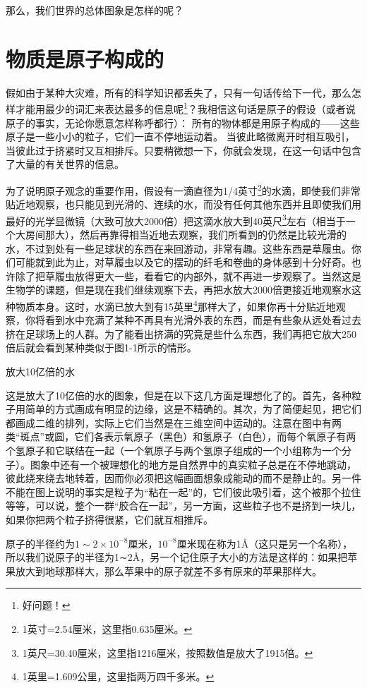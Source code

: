 \documentclass[12pt,oneside]{book}
\begin{document}
那么，我们世界的总体图象是怎样的呢？


\section{物质是原子构成的}
假如由于某种大灾难，所有的科学知识都丢失了，只有一句话传给下一代，那么怎样才能用最少的词汇来表达最多的信息呢\footnote{好问题！}？我相信这句话是原子的假设（或者说原子的事实，无论你愿意怎样称呼都行）： 所有的物体都是用原子构成的——这些原子是一些小小的粒子，它们一直不停地运动着。 当彼此略微离开时相互吸引， 当彼此过于挤紧时又互相排斥。只要稍微想一下，你就会发现，在这一句话中包含了大量的有关世界的信息。

为了说明原子观念的重要作用，假设有一滴直径为1/4英寸\footnote{1英寸=2.54厘米，这里指0.635厘米。}的水滴，即使我们非常贴近地观察，也只能见到光滑的、连续的水，而没有任何其他东西并且即使我们用最好的光学显微镜（大致可放大2000倍）把这滴水放大到40英尺\footnote{1英尺=30.40厘米，这里指1216厘米，按照数值是放大了1915倍。}左右（相当于一个大房间那大），然后再靠得相当近地去观察，我们所看到的仍然是比较光滑的水，不过到处有一些足球状的东西在来回游动，非常有趣。这些东西是草履虫。你们可能就到此为止，对草履虫以及它的摆动的纤毛和卷曲的身体感到十分好奇。也许除了把草履虫放得更大一些，看看它的内部外，就不再进一步观察了。当然这是生物学的课题，但是现在我们继续观察下去，再把水放大2000倍更接近地观察水这种物质本身。这时，水滴已放大到有15英里\footnote{1英里=1.609公里，这里指两万四千多米。}那样大了，如果你再十分贴近地观察，你将看到水中充满了某种不再具有光滑外表的东西，而是有些象从远处看过去挤在足球场上的人群。为了能看出挤满的究竟是些什么东西，我们再把它放大250倍后就会看到某种类似于图1-1所示的情形。
\begin{fig}{放大10亿倍的水}
\caption{放大10亿倍的水}
\label{fig:放大10亿倍的水}
\end{fig}
这是放大了10亿倍的水的图象，但是在以下这几方面是理想化了的。首先，各种粒子用简单的方式画成有明显的边缘，这是不精确的。其次，为了简便起见，把它们都画成二维的排列，实际上它们当然是在三维空间中运动的。注意在图中有两类“斑点”或圆，它们各表示氧原子（黑色）和氢原子（白色），而每个氧原子有两个氢原子和它联结在一起（一个氧原子与两个氢原子组成的一个小组称为一个分子）。图象中还有一个被理想化的地方是自然界中的真实粒子总是在不停地跳动，彼此绕来绕去地转着，因而你必须把这幅画面想象成能动的而不是静止的。另一件不能在图上说明的事实是粒子为“粘在一起”的，它们彼此吸引着，这个被那个拉住等等，可以说，整个一群“胶合在一起”，另一方面，这些粒子也不是挤到一块儿，如果你把两个粒子挤得很紧，它们就互相推斥。

原子的半径约为$1\sim2\times10^{-8}$厘米，$ 10^{-8} $厘米现在称为1Å（这只是另一个名称），所以我们说原子的半径为1∼2Å，另一个记住原子大小的方法是这样的：如果把苹果放大到地球那样大，那么苹果中的原子就差不多有原来的苹果那样大。
\end{document}
